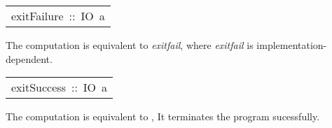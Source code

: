 \begin{haddockdesc}
\item[\begin{tabular}{@{}l}
exitFailure\ ::\ IO\ a
\end{tabular}]\haddockbegindoc
The computation  is equivalent to
  \haddocktt{(} \emph{exitfail}\haddocktt{)},
 where \emph{exitfail} is implementation-dependent.
\par

\end{haddockdesc}
\begin{haddockdesc}
\item[\begin{tabular}{@{}l}
exitSuccess\ ::\ IO\ a
\end{tabular}]\haddockbegindoc
The computation  is equivalent to
  , It terminates the program
 sucessfully.
\par

\end{haddockdesc}